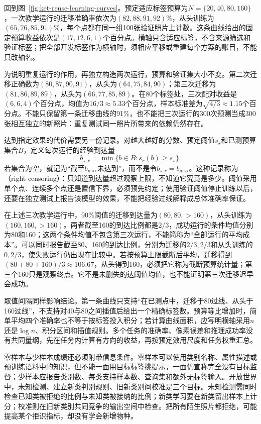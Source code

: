 回到图~\ref{fig:ket-reuse-learning-curves}。预定适应标签预算为$N=\{20,40,80,160\}$，一次教学运行的迁移准确率依次为$(82,88,91,92)\%$，从头训练为$(65,76,85,91)\%$，每个点都在同一组100张验证照片上计数。这条曲线给出的固定预算收益依次是$(17,12,6,1)$个百分点。横轴只含适应标签，不含来源筛选和验证标签；把全部开发标签作为横轴时，须相应平移或重建每个方案的账目，不能只改轴名。

为说明重复运行的作用，再独立构造两次运行，预算和验证集大小不变。第二次迁移正确数为$(80,87,90,91)$，从头为$(64,75,84,90)$；第三次迁移为$(81,86,89,89)$，从头为$(66,77,85,89)$。在80个标签处，三次配对收益是$(6,6,4)$个百分点，均值为$16/3\approx5.33$个百分点，样本标准差为$\sqrt{4/3}\approx1.15$个百分点。不能只保留第一条迁移曲线的91\%，也不能把三次运行的300次预测当成300张相互独立的新照片：重复测试同一照片所带来的依赖仍然存在。

达到指定效果的代价需要另一份记录。对越大越好的分数、预定阈值$s_\star$和已测预算集合$B$，定义每次运行的经验到达量
\begin{equation}
  b_{\star,r}=\min\{b\in B:s_r(b)\geq s_\star\}.
  \label{eq:ket-evaluation-threshold}
\end{equation}
若集合为空，就记为“截至$b_{\max}$未达到”，而不是令$b_{\star,r}=b_{\max}$。这种记录称为（right censoring）：只知道到达量超过观察上限，不知道它究竟是多少。阈值采用单个点、连续多个点还是置信下界，必须预先约定；使用验证阈值停止训练以后，还要在独立测试上报告该模型的效果，不能把经验过线解释成总体准确率保证。

在上述三次教学运行中，90\%阈值的迁移到达量为$(80,80,>160)$，从头训练为$(160,160,>160)$。两者截至160的到达比例都是$2/3$，成功运行的条件均值分别为80和160；这两个条件均值不包含第三次运行，不能简称为“全部运行的平均成本”。可以同时报告截至80、160的到达比例，分别为迁移的$2/3,2/3$和从头训练的$0,2/3$，使失败运行仍出现在比较中。若按预算上限截断后平均，迁移得到$(80+80+160)/3\approx106.67$，从头得到160，必须把它称为截断预算统计量；第三个160只是观察终点。它不是未删失的达阈值均值，也不能证明第三次迁移迟早会成功。

取值间隔同样影响结论。第一条曲线只支持“在已测点中，迁移于80过线、从头于160过线”，不支持对40与80之间插值后给出一个精确标签数。预算等比增加时，简单平均四个准确率也不等于按标签投入积分；若计算曲线面积，应写明横轴采用$n$还是$\log n$、积分区间和插值规则。多个任务的准确率、像素误差和推理成功率没有共同量纲，先在任务内计算有方向的收益，再按预定效用尺度和任务权重汇总。

零样本与少样本成绩还必须附带信息条件。零样本可以使用类别名称、属性描述或预训练语料中的知识，但不能一面用目标标签挑提示，一面仍宣称完全没有目标监督；少样本应报告类别数、每类支持样本数、查询集和额外无标签输入。开放世界中，未知检测、建立新类判别规则、旧新类别间校准是三个目标。未知检测需同时检查已知类被拒绝的比例与未知类被接纳的比例；新类学习要在新类留出样本上计分；校准则在旧新类别共同竞争的输出空间中检查。把所有陌生照片都拒绝，可能提高某个拒识指标，却没有学会新增物种。

